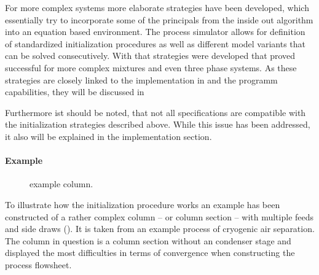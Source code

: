         For more complex systems more elaborate strategies have been developed, which essentially try
        to incorporate some of the principals from the inside out algorithm into an equation based
        environment. The process simulator \gproms allows for definition of standardized initialization
        procedures as well as different model variants that can be solved consecutively. With that strategies
        were developed that proved successful for more complex mixtures and even three phase systems. As
        these strategies are closely linked to the implementation in \gproms and the programm
        capabilities, they will be discussed in 

        Furthermore ist should be noted, that not all specifications are compatible with the initialization
        strategies described above. While this issue has been addressed, it also will be explained in the
        implementation section.

        \paragraph{Example}

        \begin{figure}
            \begin{minipage}{0.25\textwidth}
                
                \caption{example column.}
                \label{fig:lpc_example}
            \end{minipage}
            \begin{minipage}{0.73\textwidth}
                \raisebox{\depth}{\footnotesize}
                \label{fig:lpc_example}
            \end{minipage}
        \end{figure}

        To illustrate how the initialization procedure works an example has been constructed of
        a rather complex column -- or column section -- with multiple feeds and side draws ().
        It is taken from an example process of cryogenic air separation. The column in question
        is a column section without an condenser stage and displayed the most difficulties in terms
        of convergence when constructing the process flowsheet.

